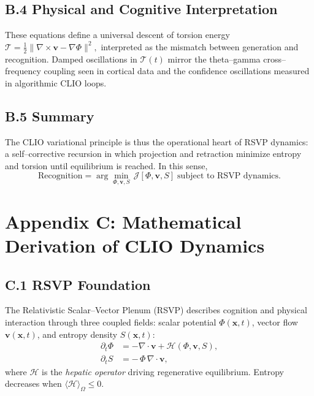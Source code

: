 \documentclass[11pt]{article}
\begin{document}
\subsection*{B.4 Physical and Cognitive Interpretation}
These equations define a universal descent of torsion energy
\(
\mathcal{T}=\tfrac{1}{2}\|\nabla\times\mathbf{v}-\nabla\Phi\|^{2},
\)
interpreted as the mismatch between generation and recognition.  
Damped oscillations in $\mathcal{T}(t)$ mirror the 
theta–gamma cross–frequency coupling seen in cortical data and the confidence
oscillations measured in algorithmic CLIO loops.

\subsection*{B.5 Summary}
The CLIO variational principle is thus the operational heart of RSVP dynamics:
a self–corrective recursion in which projection and retraction minimize entropy
and torsion until equilibrium is reached.  
In this sense,
\[
\boxed{
\text{Recognition} = 
\arg\!\min_{\Phi,\mathbf{v},S}\,
\mathcal{J}[\Phi,\mathbf{v},S]
\;\text{subject to RSVP dynamics.}
}
\]

\section*{Appendix C: Mathematical Derivation of CLIO Dynamics}

\subsection*{C.1 RSVP Foundation}
The Relativistic Scalar–Vector Plenum (RSVP) describes cognition and physical
interaction through three coupled fields:
scalar potential $\Phi(\mathbf{x},t)$, vector flow $\mathbf{v}(\mathbf{x},t)$, and
entropy density $S(\mathbf{x},t)$:
\begin{align}
\partial_t \Phi &= -\nabla\!\cdot\!\mathbf{v} + \mathcal{H}(\Phi,\mathbf{v},S), \\
\partial_t S    &= -\,\Phi\,\nabla\!\cdot\!\mathbf{v},
\end{align}
where $\mathcal{H}$ is the \emph{hepatic operator} driving regenerative
equilibrium.  
Entropy decreases when $\langle\mathcal{H}\rangle_{\Omega}\!\le 0$.
\end{document}
